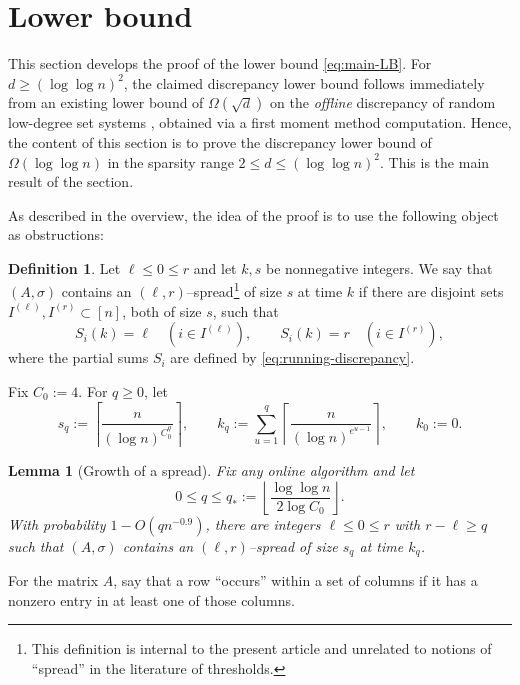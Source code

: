 \documentclass[reqno,english]{amsart}
\newtheorem{lemma}[lemma]{Lemma}
\theoremstyle{definition}
\newtheorem{definition}[definition]{Definition}
\begin{document}
\section{Lower bound}\label{sec:lower}

This section develops the proof of the lower bound \eqref{eq:main-LB}. For $d \ge (\log\log n)^2$, the claimed discrepancy lower bound follows immediately from an existing lower bound of $\Omega(\sqrt{d})$ on the \textit{offline} discrepancy of random low-degree set systems \cite{random-hypergraph-discrepancy}, obtained via a first moment method computation. Hence, the content of this section is to prove the discrepancy lower bound of $\Omega(\log\log n)$ in the sparsity range
$2 \le d\le(\log\log n)^2$. This is the main result of the section. 


As described in the overview, the idea of the proof is to use the following object as obstructions:

\begin{definition}
Let $\ell\le0\le r$ and let $k,s$ be nonnegative integers.  We say that
$(A,\sigma)$ contains an $(\ell,r)$--spread\footnote{ This definition is internal to the present article and unrelated to notions of ``spread'' in the literature of thresholds.} of size $s$ at time $k$ if there
are disjoint sets $I^{(\ell)},I^{(r)}\subset[n]$, both of size $s$, such that
\[
    S_i(k)=\ell\quad(i\in I^{(\ell)}),
    \qquad
    S_i(k)=r\quad(i\in I^{(r)}),
\]
where the {partial} sums $S_i$ are defined by \eqref{eq:running-discrepancy}.
\end{definition}

Fix $C_0:=4$.  For $q\ge0$, let
\begin{equation}\label{eq:lower-parameters}
    s_q:=\left\lceil\frac{n}{(\log n)^{C_0^q}}\right\rceil,
    \qquad
    k_q:=\sum_{u=1}^q
       \left\lceil\frac{n}{(\log n)^{e^{u-1}}}\right\rceil,
    \qquad k_0:=0.
\end{equation}

\begin{lemma}[Growth of a spread]\label{lem:spread}
Fix any online algorithm and let
\[
    0\le q\le q_*:=\left\lfloor
       \frac{\log\log n}{2\log C_0}\right\rfloor.
\]
With probability $1-O(qn^{-0.9})$, there are integers
$\ell\le0\le r$ with $r-\ell\ge q$ such that $(A,\sigma)$ contains an
$(\ell,r)$--spread of size $s_q$ at time $k_q$.
\end{lemma}

For the matrix $A$, say that a row ``occurs'' within a set of columns if it {has a nonzero entry in at least one of those columns}. 
\end{document}
